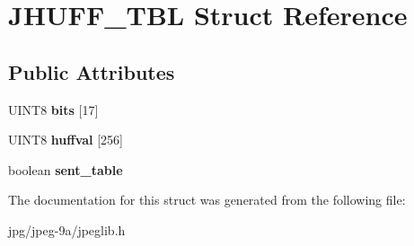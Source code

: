 \hypertarget{struct_j_h_u_f_f___t_b_l}{\section{J\+H\+U\+F\+F\+\_\+\+T\+B\+L Struct Reference}
\label{struct_j_h_u_f_f___t_b_l}
}
\subsection*{Public Attributes}
\begin{DoxyCompactItemize}
\item 
\hypertarget{struct_j_h_u_f_f___t_b_l_a68b0ec25d6d06c13e0a4f74fbb683b3f}{U\+I\+N\+T8 {\bfseries bits} \mbox{[}17\mbox{]}}\label{struct_j_h_u_f_f___t_b_l_a68b0ec25d6d06c13e0a4f74fbb683b3f}

\item 
\hypertarget{struct_j_h_u_f_f___t_b_l_a7aad276f6ced97323bb94ba5e6220961}{U\+I\+N\+T8 {\bfseries huffval} \mbox{[}256\mbox{]}}\label{struct_j_h_u_f_f___t_b_l_a7aad276f6ced97323bb94ba5e6220961}

\item 
\hypertarget{struct_j_h_u_f_f___t_b_l_a387c655e83d0d57c50802856d630f37b}{boolean {\bfseries sent\+\_\+table}}\label{struct_j_h_u_f_f___t_b_l_a387c655e83d0d57c50802856d630f37b}

\end{DoxyCompactItemize}


The documentation for this struct was generated from the following file\+:\begin{DoxyCompactItemize}
\item 
jpg/jpeg-\/9a/jpeglib.\+h\end{DoxyCompactItemize}
